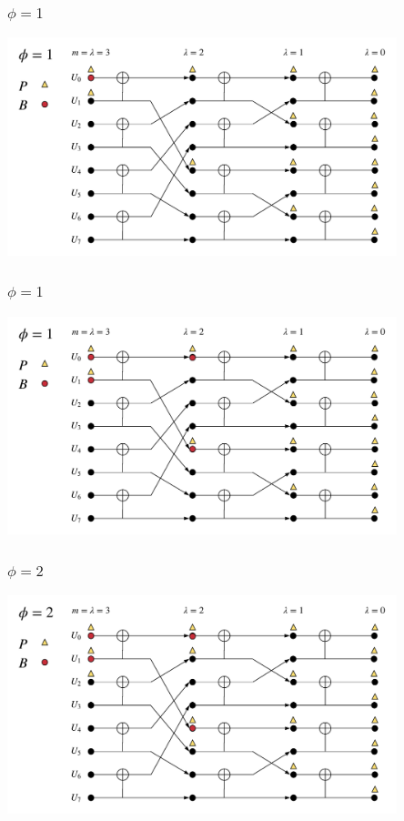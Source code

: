 \documentclass{beamer}
\begin{document}
\begin{frame}
\frametitle{$\phi=1$}
  \begin{center}
  \includegraphics[width=0.85\textwidth]{scl_pics/CalcP_1.png}
  \end{center}
\end{frame}

\begin{frame}
\frametitle{$\phi=1$}
  \begin{center}
  \includegraphics[width=0.85\textwidth]{scl_pics/UpdateB_1.png}
  \end{center}
\end{frame}

\begin{frame}
\frametitle{$\phi=2$}
  \begin{center}
  \includegraphics[width=0.85\textwidth]{scl_pics/CalcP_2.png}
  \end{center}
\end{frame}
\end{document}
